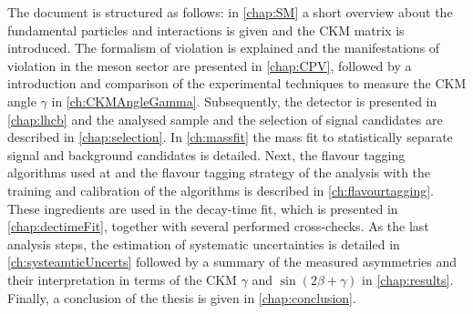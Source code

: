 The document is structured as follows:
in \cref{chap:SM} a short overview about the fundamental particles and interactions is given and the CKM matrix is introduced.
The formalism of \CP violation is explained and the manifestations of \CP violation in the \B meson sector are presented in \cref{chap:CPV}, followed by a introduction and comparison of the experimental techniques to measure the CKM angle $\gamma$  in \cref{ch:CKMAngleGamma}.
Subsequently, the \lhcb detector is presented in \cref{chap:lhcb} and the analysed sample and the selection of signal candidates are described in \cref{chap:selection}.
In \cref{ch:massfit} the mass fit to statistically separate signal and background candidates is detailed.
Next, the flavour tagging algorithms used at \lhcb and the flavour tagging strategy of the analysis with the training and calibration of the algorithms is described in \cref{ch:flavourtagging}.
These ingredients are used in the decay-time fit, which is presented in \cref{chap:dectimeFit}, together with several performed cross-checks.
As the last analysis steps, the estimation of systematic uncertainties is detailed in \cref{ch:systeamticUncerts} followed by a summary of the measured \CP asymmetries and their interpretation in terms of the CKM $\gamma$ and $\sin\!\left(2\beta+\gamma\right)$ in \cref{chap:results}.
Finally, a conclusion of the thesis is given in \cref{chap:conclusion}.
